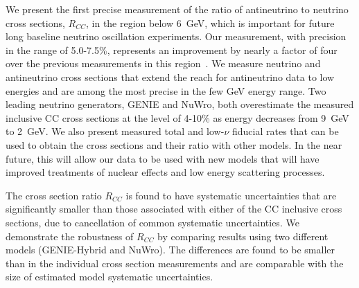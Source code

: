 \documentclass[aps,preprint,showpacs,superscriptaddress,linenumbers,nofootinbib,prd,12pt]{revtex4}
\newcommand{\ratio}{\ensuremath{R_{CC}}}
\begin{document}
{{We present the first precise measurement of the ratio of antineutrino to neutrino cross sections, \ratio{}, in the region below 6~GeV, which is important for future long baseline neutrino oscillation experiments. Our measurement, with precision in the range of 5.0-7.5\%, represents an improvement by nearly a factor of four over 
the previous measurements in this region~\cite{Eichten:1973cs}.
We measure neutrino and antineutrino cross sections that extend the reach for antineutrino data to low energies and are among the most precise in the few GeV energy range. Two leading neutrino generators, GENIE and NuWro, both overestimate the measured 
inclusive CC cross sections at the level of 4-10\% as energy decreases from 9~GeV to 2~GeV.
We also present measured total and low-$\nu$ fiducial rates that can be used to obtain the cross sections and their ratio with other models.
In the near future, this will allow our data to be used with new models that will have improved treatments of nuclear effects and low energy scattering processes. 


The cross section ratio \ratio{} is found to have systematic uncertainties that are significantly smaller than those associated with either of the CC inclusive cross sections, due to cancellation of common systematic uncertainties. 
We demonstrate the robustness of \ratio{} by comparing results using two different models 
(GENIE-Hybrid and NuWro). The differences are found to be smaller than in the individual cross
section measurements and are comparable with the size of estimated model systematic uncertainties. 


}}
\end{document}
